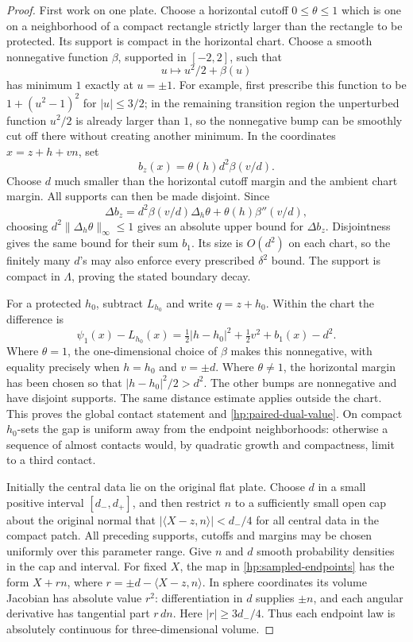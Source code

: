 \begin{proof}
First work on one plate.  Choose a horizontal cutoff $0\leq\theta\leq1$
which is one on a neighborhood of a compact rectangle strictly larger
than the rectangle to be protected.  Its support is compact in the
horizontal chart.  Choose a smooth nonnegative function $\beta$,
supported in $[-2,2]$, such that
\[
 u\longmapsto u^2/2+\beta(u)
\]
has minimum $1$ exactly at $u=\pm1$.  For example, first prescribe this
function to be $1+(u^2-1)^2$ for $|u|\leq3/2$; in the remaining
transition region the unperturbed function $u^2/2$ is already larger
than $1$, so the nonnegative bump can be smoothly cut off there without
creating another minimum.  In the coordinates $x=z+h+vn$, set
\begin{equation}\label{hp:well-formula}
 b_z(x)=\theta(h)d^2\beta(v/d).
\end{equation}
Choose $d$ much smaller than the horizontal cutoff margin and the
ambient chart margin.  All supports can then be made disjoint.  Since
\[
 \Delta b_z=d^2\beta(v/d)\Delta_h\theta+
                     \theta(h)\beta''(v/d),
\]
choosing $d^2\|\Delta_h\theta\|_\infty\leq1$ gives an absolute upper
bound for $\Delta b_z$.  Disjointness gives the same bound for their
sum $b_1$.  Its size is $O(d^2)$ on each chart, so the finitely many
$d$'s may also enforce every prescribed $\delta^2$ bound.  The support
is compact in $\Lambda$, proving the stated boundary decay.

For a protected $h_0$, subtract $L_{h_0}$ and write $q=z+h_0$.  Within
the chart the difference is
\[
 \psi_1(x)-L_{h_0}(x)
 =\tfrac12|h-h_0|^2+\tfrac12v^2+b_1(x)-d^2.
\]
Where $\theta=1$, the one-dimensional choice of $\beta$ makes this
nonnegative, with equality precisely when $h=h_0$ and $v=\pm d$.
Where $\theta\ne1$, the horizontal margin has been chosen so that
$|h-h_0|^2/2>d^2$.  The other bumps are nonnegative and have disjoint
supports.  The same distance estimate applies outside the chart.
This proves the global contact statement and
\eqref{hp:paired-dual-value}.  On compact $h_0$-sets the gap is
uniform away from the endpoint neighborhoods: otherwise a sequence
of almost contacts would, by quadratic growth and compactness, limit
to a third contact.

Initially the central data lie on the original flat plate.  Choose $d$
in a small positive interval $[d_-,d_+]$, and then restrict $n$ to a
sufficiently small open cap about the original normal that
$|\langle X-z,n\rangle|<d_-/4$ for all central data in the compact
patch.  All preceding supports, cutoffs and margins may be chosen
uniformly over this parameter range.  Give $n$ and $d$ smooth
probability densities in the cap and interval.  For fixed $X$, the map
in \eqref{hp:sampled-endpoints} has the form $X+r n$, where
$r=\pm d-\langle X-z,n\rangle$.  In sphere coordinates its volume
Jacobian has absolute value $r^2$: differentiation in $d$ supplies
$\pm n$, and each angular derivative has tangential part $r\,dn$.
Here $|r|\geq3d_-/4$.  Thus each endpoint law is absolutely continuous
for three-dimensional volume.


\end{proof}
